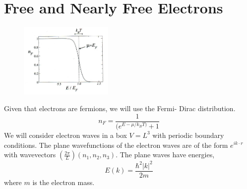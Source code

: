 \documentclass[a4paper, 11pt, normalem]{report}
\begin{document}
\chapter{Free and Nearly Free Electrons}
\begin{figure}
    \centering
    \includegraphics[width=0.4\textwidth]{fd.png}
\end{figure}
Given that electrons are fermions, we will use the Fermi- Dirac distribution. 
\begin{equation}
    n_F = \frac{1}{(e^{E-\mu/k_BT)}+1}
\end{equation}
We will consider electron waves in a box $V=L^3$ with periodic boundary conditions. 
The plane wavefunctions of the electron waves are of the form $e^{ik\cdot r}$ with wavevectors $(\frac{2\pi}{L})(n_1,n_2,n_3)$.
The plane waves have energies,
\begin{equation}
    E(k) = \frac{\hbar^2|k|^2}{2m}
\end{equation}
where $m$ is the electron mass. 
\end{document}
